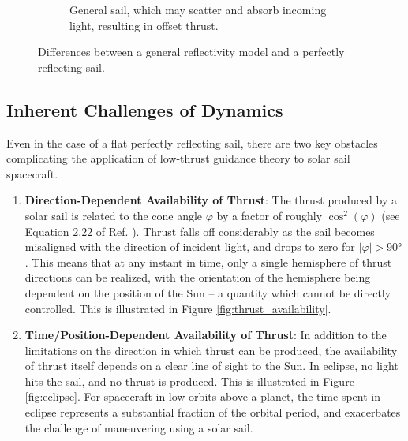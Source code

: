 \begin{figure}[H]
\begin{subfigure}[t]{0.49\textwidth}
    \caption{General sail, which may scatter and absorb incoming light, resulting in offset thrust.}
    \label{fig:general_sail}
  \end{subfigure}
  \caption{Differences between a general reflectivity model and a perfectly reflecting sail.}
  \label{fig:sail_reflectivity_comparison}
\end{figure}

\subsection{Inherent Challenges of Dynamics}
Even in the case of a flat perfectly reflecting sail, there are two key obstacles complicating the application of low-thrust guidance theory to solar sail spacecraft.
\begin{enumerate}
  \item \textbf{Direction-Dependent Availability of Thrust}: The thrust produced by a solar sail is related to the cone angle $\varphi$ by a factor of roughly $\cos^2(\varphi)$ (see Equation 2.22 of Ref. \cite{mcinnes}). Thrust falls off considerably as the sail becomes misaligned with the direction of incident light, and drops to zero for $|\varphi| > \ang{90}$. This means that at any instant in time, only a single hemisphere of thrust directions can be realized, with the orientation of the hemisphere being dependent on the position of the Sun -- a quantity which cannot be directly controlled. This is illustrated in Figure \ref{fig:thrust_availability}.
  \item \textbf{Time/Position-Dependent Availability of Thrust}: In addition to the limitations on the direction in which thrust can be produced, the availability of thrust itself depends on a clear line of sight to the Sun. In eclipse, no light hits the sail, and no thrust is produced. This is illustrated in Figure \ref{fig:eclipse}. For spacecraft in low orbits above a planet, the time spent in eclipse represents a substantial fraction of the orbital period, and exacerbates the challenge of maneuvering using a solar sail.
\end{enumerate}

